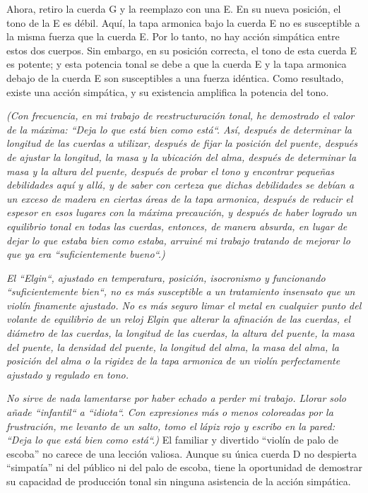 \documentclass[12pt]{book}
\begin{document}
Ahora, retiro la cuerda G y la reemplazo con una E. En su nueva posición, el tono de la E es débil. Aquí, la tapa armonica bajo la cuerda E no es susceptible a la misma fuerza que la cuerda E. Por lo tanto, no hay acción simpática entre estos dos cuerpos. Sin embargo, en su posición correcta, el tono de esta cuerda E es potente; y esta potencia tonal se debe a que la cuerda E y la tapa armonica debajo de la cuerda E son susceptibles a una fuerza idéntica. Como resultado, existe una acción simpática, y su existencia amplifica la potencia del tono.

\textit{(Con frecuencia, en mi trabajo de reestructuración tonal, he demostrado el valor de la máxima: ``Deja lo que está bien como está``. Así, después de determinar la longitud de las cuerdas a utilizar, después de fijar la posición del puente, después de ajustar la longitud, la masa y la ubicación del alma, después de determinar la masa y la altura del puente, después de probar el tono y encontrar pequeñas debilidades aquí y allá, y de saber con certeza que dichas debilidades se debían a un exceso de madera en ciertas áreas de la tapa armonica, después de reducir el espesor en esos lugares con la máxima precaución, y después de haber logrado un equilibrio tonal en todas las cuerdas, entonces, de manera absurda, en lugar de dejar lo que estaba bien como estaba, arruiné mi trabajo tratando de mejorar lo que ya era ``suficientemente bueno``.)}

\textit{El ``Elgin``, ajustado en temperatura, posición, isocronismo y funcionando ``suficientemente bien``, no es más susceptible a un tratamiento insensato que un violín finamente ajustado. No es más seguro limar el metal en cualquier punto del volante de equilibrio de un reloj Elgin que alterar la afinación de las cuerdas, el diámetro de las cuerdas, la longitud de las cuerdas, la altura del puente, la masa del puente, la densidad del puente, la longitud del alma, la masa del alma, la posición del alma o la rigidez de la tapa armonica de un violín perfectamente ajustado y regulado en tono.}

\textit{No sirve de nada lamentarse por haber echado a perder mi trabajo. Llorar solo añade ``infantil`` a ``idiota``. Con expresiones más o menos coloreadas por la frustración, me levanto de un salto, tomo el lápiz rojo y escribo en la pared: ``Deja lo que está bien como está``.)}
El familiar y divertido ``violín de palo de escoba'' no carece de una lección valiosa. Aunque su única cuerda D no despierta ``simpatía'' ni del público ni del palo de escoba, tiene la oportunidad de demostrar su capacidad de producción tonal sin ninguna asistencia de la acción simpática.
\end{document}
